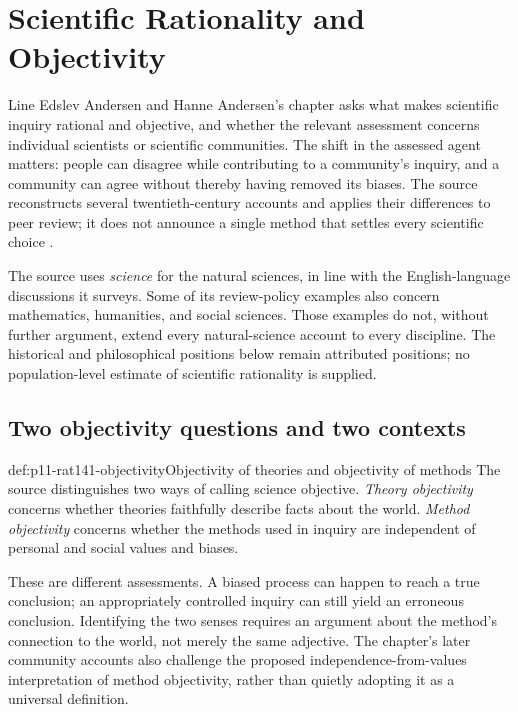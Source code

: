\chapter{Scientific Rationality and Objectivity}
\label{sec:p11-rationality-14-1}

Line Edslev Andersen and Hanne Andersen's chapter asks what makes
scientific inquiry rational and objective, and whether the relevant
assessment concerns individual scientists or scientific communities.
The shift in the assessed agent matters: people can disagree while
contributing to a community's inquiry, and a community can agree without
thereby having removed its biases. The source reconstructs several
twentieth-century accounts and applies their differences to peer review;
it does not announce a single method that settles every scientific
choice \parencite[pp.~747--753]{AndersenAndersen2021Scientific}.

The source uses \emph{science} for the natural sciences, in line with
the English-language discussions it surveys. Some of its review-policy
examples also concern mathematics, humanities, and social sciences.
Those examples do not, without further argument, extend every
natural-science account to every discipline. The historical and
philosophical positions below remain attributed positions; no
population-level estimate of scientific rationality is supplied.

\section{Two objectivity questions and two contexts}
\label{sec:p11-rat141-individual}

\begin{hbdefinition}{def:p11-rat141-objectivity}{Objectivity of theories and objectivity of methods}
The source distinguishes two ways of calling science objective.
\emph{Theory objectivity} concerns whether theories faithfully describe
facts about the world. \emph{Method objectivity} concerns whether the
methods used in inquiry are independent of personal and social values
and biases.

These are different assessments. A biased process can happen to reach
a true conclusion; an appropriately controlled inquiry can still yield
an erroneous conclusion. Identifying the two senses requires an
argument about the method's connection to the world, not merely the
same adjective. The chapter's later community accounts also challenge
the proposed independence-from-values interpretation of method
objectivity, rather than quietly adopting it as a universal definition.
\end{hbdefinition}

